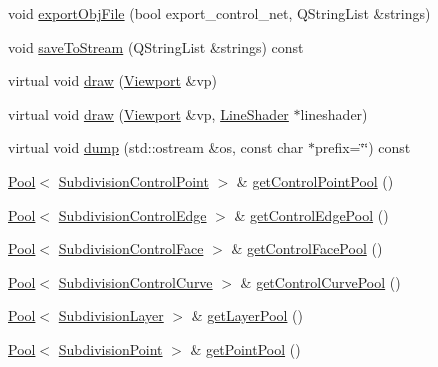\begin{DoxyCompactItemize}
\item 
void \hyperlink{classShipCAD_1_1SubdivisionSurface_a8859af0a44d7f858d0febbd58efd2820}{export\+Obj\+File} (bool export\+\_\+control\+\_\+net, Q\+String\+List \&strings)
\item 
void \hyperlink{classShipCAD_1_1SubdivisionSurface_ac53390809ec7efe26fe7514f88b05732}{save\+To\+Stream} (Q\+String\+List \&strings) const 
\item 
virtual void \hyperlink{classShipCAD_1_1SubdivisionSurface_acfe9cc964dbe05105486b43f2dc6fc4f}{draw} (\hyperlink{classShipCAD_1_1Viewport}{Viewport} \&vp)
\item 
virtual void \hyperlink{classShipCAD_1_1SubdivisionSurface_ab1c250ff9fa7acae3ecdca4575f3e259}{draw} (\hyperlink{classShipCAD_1_1Viewport}{Viewport} \&vp, \hyperlink{classShipCAD_1_1LineShader}{Line\+Shader} $\ast$lineshader)
\item 
virtual void \hyperlink{classShipCAD_1_1SubdivisionSurface_a6ed961bbb7ca5fe94ec5566109d9b015}{dump} (std\+::ostream \&os, const char $\ast$prefix=\char`\"{}\char`\"{}) const 
\item 
\hyperlink{classPool}{Pool}$<$ \hyperlink{classShipCAD_1_1SubdivisionControlPoint}{Subdivision\+Control\+Point} $>$ \& \hyperlink{classShipCAD_1_1SubdivisionSurface_ace460b788afd5d4612be52a2600980b9}{get\+Control\+Point\+Pool} ()
\item 
\hyperlink{classPool}{Pool}$<$ \hyperlink{classShipCAD_1_1SubdivisionControlEdge}{Subdivision\+Control\+Edge} $>$ \& \hyperlink{classShipCAD_1_1SubdivisionSurface_ab0204125d7a69f89a82ea748b1f5663d}{get\+Control\+Edge\+Pool} ()
\item 
\hyperlink{classPool}{Pool}$<$ \hyperlink{classShipCAD_1_1SubdivisionControlFace}{Subdivision\+Control\+Face} $>$ \& \hyperlink{classShipCAD_1_1SubdivisionSurface_a06c7bafebafcafca20ed044f11733c48}{get\+Control\+Face\+Pool} ()
\item 
\hyperlink{classPool}{Pool}$<$ \hyperlink{classShipCAD_1_1SubdivisionControlCurve}{Subdivision\+Control\+Curve} $>$ \& \hyperlink{classShipCAD_1_1SubdivisionSurface_a2c4ae9dd2926ceabc10351863923cf41}{get\+Control\+Curve\+Pool} ()
\item 
\hyperlink{classPool}{Pool}$<$ \hyperlink{classShipCAD_1_1SubdivisionLayer}{Subdivision\+Layer} $>$ \& \hyperlink{classShipCAD_1_1SubdivisionSurface_ad124b77753880a92de21d5d16333f966}{get\+Layer\+Pool} ()
\item 
\hyperlink{classPool}{Pool}$<$ \hyperlink{classShipCAD_1_1SubdivisionPoint}{Subdivision\+Point} $>$ \& \hyperlink{classShipCAD_1_1SubdivisionSurface_aa3d1e5d4a140b127e986b13de26e67f7}{get\+Point\+Pool} ()

\end{DoxyCompactItemize}
